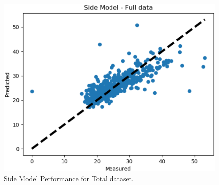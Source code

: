 \documentclass[conference]{IEEEtran}
\begin{document}
\begin{figure}[H]
\begin{minipage}[b]{0.25\textwidth}
    \end{minipage}
    \hspace{1cm}
    \begin{minipage}[b]{0.25\textwidth}
    \includegraphics[width=\linewidth]{sidescatter.png}
    \caption{Side Model Performance for Total dataset.}
    \label{fig:sidescatter}
    \end{minipage}
\end{figure}
\end{document}
